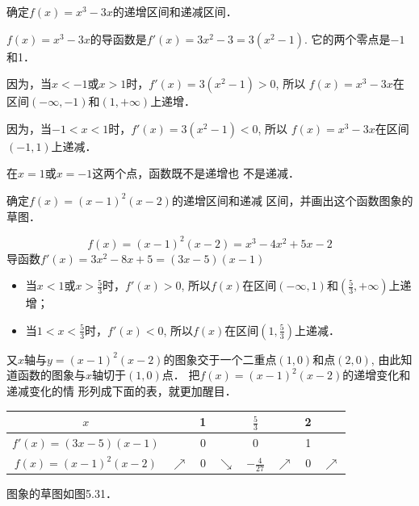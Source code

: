 \begin{example}
  确定$f(x)=x^3-3x$的递增区间和递减区间．  
\end{example}

\begin{solution}
$f(x)=x^3-3x$的导函数是$f'(x)=3x^2-3=3(x^2-
1)$. 它的两个零点是$-1$和1．

因为，当$x<-1$或$x>1$时，$f'(x)=3(x^2-1)>0$, 所以
$f(x)=x^3-3x$在区间$(-\infty,-1)$和$(1,+\infty)$上递增．

因为，当$-1<x<1$时，$f'(x)=3(x^2-1)<0$, 所以
$f(x)=x^3-3x$在区间$(-1,1)$上递减．
\end{solution}

\begin{rmk}
在$x=1$或$x=-1$这两个点，函数既不是递增也
不是递减．
\end{rmk}

\begin{example}
    确定$f(x)=(x-1)^2(x-2)$的递增区间和递减
区间，并画出这个函数图象的草图．
\end{example}

\begin{solution}
\[f(x)=(x-1)^2(x-2)=x^3-4x^2+5x-2\]
导函数$f'(x)=3x^2-8x+5=(3x-5)(x-1)$

\begin{itemize}
    \item 当$x<1$或$x>\frac{5}{3}$时，$f'(x)>0$, 所以$f(x)$在区间$(-\infty,1)$和$\left(\frac{5}{3},+\infty\right)$上递增；
    \item 当$1<x<\frac{5}{3}$时，$f'(x)<0$, 所以$f(x)$在区间$\left(1,\frac{5}{3}\right)$上递减．
\end{itemize}

又$x$轴与$y=(x-1)^2(x-2)$的图象交于一个二重点$(1,
0)$和点$(2,0)$, 由此知道函数的图象与$x$轴切于$(1,0)$点．
把$f(x)=(x-1)^2(x-2)$的递增变化和递减变化的情
形列成下面的表，就更加醒目．

\begin{center}
\begin{tabular}{c|ccccccc}
    \hline
$x$&&1&&$\tfrac{5}{3}$&&2\\
    \hline
$f'(x)=(3x-5)(x-1)$&&0&&0&&1\\
$f(x)=(x-1)^2(x-2)$&$\nearrow$&0&$\searrow$&$-\tfrac{4}{27}$&$\nearrow$&0&$\nearrow$\\
    \hline
\end{tabular}
\end{center}
图象的草图如图5.31．
\begin{figure}[htp]
    \centering
{}
    \caption{}
\end{figure}
\end{solution}


